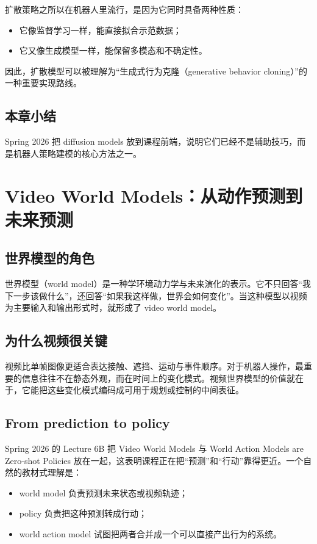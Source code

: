 \documentclass[a4paper]{article}
\begin{document}
扩散策略之所以在机器人里流行，是因为它同时具备两种性质：
\begin{itemize}
  \item 它像监督学习一样，能直接拟合示范数据；
  \item 它又像生成模型一样，能保留多模态和不确定性。
\end{itemize}

因此，扩散模型可以被理解为“生成式行为克隆（generative behavior cloning）”的一种重要实现路线。

\subsection{本章小结}

Spring 2026 把 diffusion models 放到课程前端，说明它们已经不是辅助技巧，而是机器人策略建模的核心方法之一。

\section{Video World Models：从动作预测到未来预测}

\subsection{世界模型的角色}

世界模型（world model）是一种学环境动力学与未来演化的表示。它不只回答“我下一步该做什么”，还回答“如果我这样做，世界会如何变化”。当这种模型以视频为主要输入和输出形式时，就形成了 video world model。

\subsection{为什么视频很关键}

视频比单帧图像更适合表达接触、遮挡、运动与事件顺序。对于机器人操作，最重要的信息往往不在静态外观，而在时间上的变化模式。视频世界模型的价值就在于，它能把这些变化模式编码成可用于规划或控制的中间表征。

\subsection{From prediction to policy}

Spring 2026 的 Lecture 6B 把 Video World Models 与 World Action Models are Zero-shot Policies 放在一起，这表明课程正在把“预测”和“行动”靠得更近。一个自然的教材式理解是：
\begin{itemize}
  \item world model 负责预测未来状态或视频轨迹；
  \item policy 负责把这种预测转成行动；
  \item world action model 试图把两者合并成一个可以直接产出行为的系统。
\end{itemize}
\end{document}
